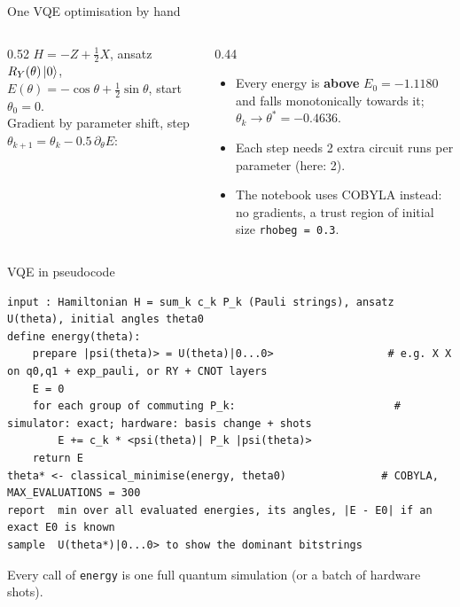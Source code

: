 \documentclass[aspectratio=169,11pt]{beamer}
\newcommand{\key}[1]{{\color{qdark}\textbf{#1}}}
\begin{document}
\begin{frame}{One VQE optimisation by hand}
  \begin{columns}[T]
    \begin{column}{0.52\textwidth}
      $H = -Z + \tfrac12X$, ansatz $R_Y(\theta)\ket0$, $E(\theta) = -\cos\theta + \tfrac12\sin\theta$, start $\theta_0 = 0$.\\[1mm]
      Gradient by parameter shift, step $\theta_{k+1} = \theta_k - 0.5\,\partial_\theta E$:
      \small
      \begin{center}
      \end{center}
    \end{column}
    \begin{column}{0.44\textwidth}
      \begin{itemize}
        \item Every energy is \key{above} $E_0 = -1.1180$ and falls monotonically towards it; $\theta_k \to \theta^* = -0.4636$.
        \item Each step needs 2 extra circuit runs per parameter (here: 2).
        \item The notebook uses COBYLA instead: no gradients, a trust region of initial size \texttt{rhobeg = 0.3}.
      \end{itemize}
    \end{column}
  \end{columns}
\end{frame}


\begin{frame}[fragile]{VQE in pseudocode}
\begin{lstlisting}[language={}, basicstyle=\ttfamily\tiny]
input : Hamiltonian H = sum_k c_k P_k (Pauli strings), ansatz U(theta), initial angles theta0
define energy(theta):
    prepare |psi(theta)> = U(theta)|0...0>                  # e.g. X X on q0,q1 + exp_pauli, or RY + CNOT layers
    E = 0
    for each group of commuting P_k:                         # simulator: exact; hardware: basis change + shots
        E += c_k * <psi(theta)| P_k |psi(theta)>
    return E
theta* <- classical_minimise(energy, theta0)               # COBYLA, MAX_EVALUATIONS = 300
report  min over all evaluated energies, its angles, |E - E0| if an exact E0 is known
sample  U(theta*)|0...0> to show the dominant bitstrings
\end{lstlisting}
  \small Every call of \texttt{energy} is one full quantum simulation (or a batch of hardware shots).
\end{frame}
\end{document}
